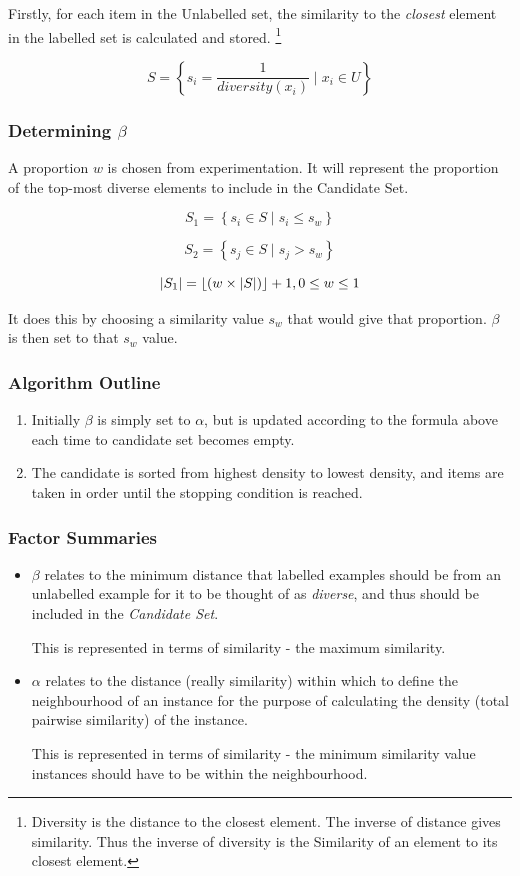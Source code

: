 \documentclass[a4paper,11pt]{report}
\begin{document}
Firstly, for each item in the Unlabelled set, the similarity to the \emph{closest} element in the labelled set is calculated and stored. \footnote{Diversity is the distance to the closest element. The inverse of distance gives similarity. Thus the inverse of diversity is the Similarity of an element to its closest element.}

\[
S=\left\{ s_{i}=\frac{1}{diversity(x_{i})}\mid x_{i}\in U\right\} 
\]

\subsubsection{Determining $\beta$}
A proportion $w$ is chosen from experimentation. It will represent the proportion of the top-most diverse elements to include in the Candidate Set.

\[
S_{1}=\left\{ s_{i}\in S\mid s_{i}\leq s_{w}\right\} 
\]

\[
S_{2}=\left\{ s_{j}\in S\mid s_{j}>s_{w}\right\} 
\]

\[
\left|S_{1}\right|=\left\lfloor \left(w\times\left|S\right|\right)\right\rfloor +1,\hphantom{}0\leq w\leq 1
\]

It does this by choosing a similarity value $s_{w}$ that would give that proportion. $\beta$ is then set to that $s_{w}$ value.

\subsubsection{Algorithm Outline}
\begin{enumerate}
	\item Initially $\beta$ is simply set to $\alpha$, but is updated according to the formula above each time to candidate set becomes empty.
	\item The candidate is sorted from highest density to lowest density, and items are taken in order until the stopping condition is reached.
\end{enumerate}

\subsubsection{Factor Summaries}
\begin{itemize}
	\item $\beta$ relates to the minimum distance  that labelled examples should be from an unlabelled example for it to be thought of as \emph{diverse}, and thus should be included in the \emph{Candidate Set}.
	
	This is represented in terms of similarity - the maximum similarity.

	\item $\alpha$ relates to the distance (really similarity) within which to define the neighbourhood of an instance for the purpose of calculating the density (total pairwise similarity) of the instance. 
	
	This is represented in terms of similarity - the minimum similarity value instances should have to be within the neighbourhood.
	
\end{itemize}
\end{document}
